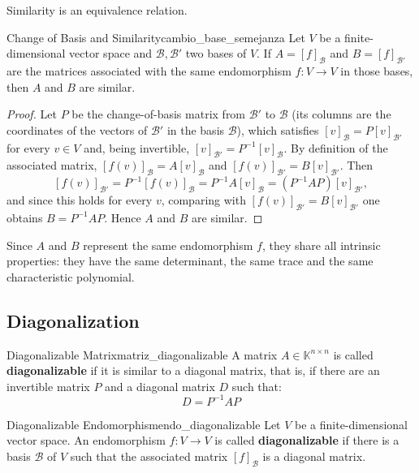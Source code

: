 \documentclass[11pt, a4paper]{article}
\begin{document}
\obs Similarity is an equivalence relation.

\begin{teorema}{Change of Basis and Similarity}{cambio_base_semejanza}
Let $V$ be a finite-dimensional vector space and $\mathcal{B}, \mathcal{B}'$ two bases of $V$.
If $A = [f]_\mathcal{B}$ and $B = [f]_{\mathcal{B}'}$ are the matrices associated with the same endomorphism $f: V \to V$ in those bases, then $A$ and $B$ are similar.
\end{teorema}

\begin{proof}
Let $P$ be the change-of-basis matrix from $\mathcal{B}'$ to $\mathcal{B}$ (its columns are the coordinates of the vectors of $\mathcal{B}'$ in the basis $\mathcal{B}$), which satisfies $[v]_\mathcal{B} = P [v]_{\mathcal{B}'}$ for every $v \in V$ and, being invertible, $[v]_{\mathcal{B}'} = P^{-1} [v]_\mathcal{B}$. By definition of the associated matrix, $[f(v)]_\mathcal{B} = A [v]_\mathcal{B}$ and $[f(v)]_{\mathcal{B}'} = B [v]_{\mathcal{B}'}$. Then
\[
[f(v)]_{\mathcal{B}'} = P^{-1} [f(v)]_\mathcal{B} = P^{-1} A [v]_\mathcal{B} = (P^{-1} A P) [v]_{\mathcal{B}'},
\]
and since this holds for every $v$, comparing with $[f(v)]_{\mathcal{B}'} = B [v]_{\mathcal{B}'}$ one obtains $B = P^{-1} A P$. Hence $A$ and $B$ are similar.
\end{proof}

\obs Since $A$ and $B$ represent the same endomorphism $f$, they share all intrinsic properties: they have the same determinant, the same trace and the same characteristic polynomial.

\subsection{Diagonalization}

\begin{definicion}{Diagonalizable Matrix}{matriz_diagonalizable}
A matrix $A \in \mathbb{K}^{n \times n}$ is called \textbf{diagonalizable} if it is similar to a diagonal matrix, that is, if there are an invertible matrix $P$ and a diagonal matrix $D$ such that:
\[ D = P^{-1} A P \]
\end{definicion}

\begin{definicion}{Diagonalizable Endomorphism}{endo_diagonalizable}
Let $V$ be a finite-dimensional vector space. An endomorphism $f: V \to V$ is called \textbf{diagonalizable} if there is a basis $\mathcal{B}$ of $V$ such that the associated matrix $[f]_\mathcal{B}$ is a diagonal matrix.
\end{definicion}
\end{document}
